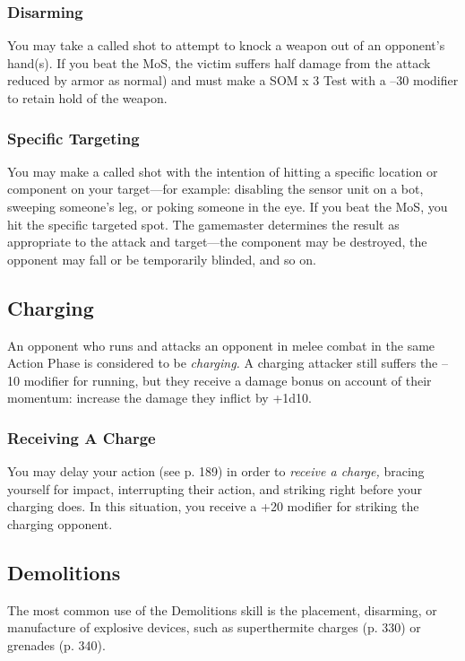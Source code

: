\subsubsection{Disarming}

You may take a called shot to attempt to knock a 
weapon out of an opponent's hand(s). If you beat the 
MoS, the victim suffers half damage from the attack reduced
by armor as normal) and must make a SOM x 3
Test with a –30 modifier to retain hold of the weapon.

\subsubsection{Specific Targeting}

You may make a called shot with the intention of hitting 
a specific location or component on your target—for 
example: disabling the sensor unit on a bot, sweeping 
someone's leg, or poking someone in the eye. If you beat 
the MoS, you hit the specific targeted spot. The gamemaster
determines the result as appropriate to the attack
and target—the component may be destroyed, the opponent
may fall or be temporarily blinded, and so on.

\subsection{Charging}

An opponent who runs and attacks an opponent in 
melee combat in the same Action Phase is considered 
to be \textit{charging.} A charging attacker still suffers the 
–10 modifier for running, but they receive a damage 
bonus on account of their momentum: increase the 
damage they inflict by +1d10.

\subsubsection{Receiving A Charge}

You may delay your action (see p. 189) in order to 
\textit{receive a charge,} bracing yourself for impact, interrupting
their action, and striking right before your
charging does. In this situation, you receive a +20 
modifier for striking the charging opponent.

\subsection{Demolitions}

The most common use of the Demolitions skill is the 
placement, disarming, or manufacture of explosive 
devices, such as superthermite charges (p. 330) or 
grenades (p. 340).


